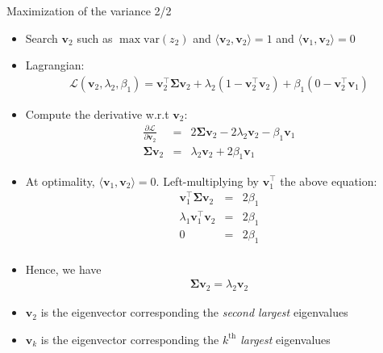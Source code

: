 \documentclass[10pt,aspectratio=1610]{beamer}
\begin{document}
\begin{frame}[label={sec:org77f1e4c}]{Maximization of the variance 2/2}
\begin{itemize}
\item <1-> Search \(\mathbf{v}_2\) such as \(\max\text{var}(z_2)\) and \(\langle\mathbf{v}_2,\mathbf{v}_2\rangle=1\) and \(\langle\mathbf{v}_1,\mathbf{v}_2\rangle=0\)
\item <2-> Lagrangian:
\begin{eqnarray*}
  \mathcal{L}(\mathbf{v}_2,\lambda_2,\beta_1) = \mathbf{v}_2^\top\boldsymbol{\Sigma}\mathbf{v}_2 + \lambda_2(1- \mathbf{v}_2^\top\mathbf{v}_2) + \beta_1(0 - \mathbf{v}_2^\top\mathbf{v}_1)
\end{eqnarray*}
\item <3-> Compute the derivative w.r.t \(\mathbf{v}_2\):
\begin{eqnarray*}
\frac{\partial\mathcal{L}}{\partial\mathbf{v}_2} &=& 2\boldsymbol{\Sigma}\mathbf{v}_2-2\lambda_2\mathbf{v}_2-\beta_1\mathbf{v}_1\\
\boldsymbol{\Sigma}\mathbf{v}_2 &=& \lambda_2\mathbf{v}_2+2\beta_1\mathbf{v}_1
\end{eqnarray*}
\item <4-> At optimality, \(\langle\mathbf{v}_1,\mathbf{v}_2\rangle=0\). Left-multiplying by \(\mathbf{v}_1^\top\) the above equation:
\begin{eqnarray*}
  \mathbf{v}_1^\top\boldsymbol{\Sigma}\mathbf{v}_2 &=& 2\beta_1 \\
  \lambda_1\mathbf{v}_1^\top\mathbf{v}_2 &=& 2\beta_1 \\
  0 &=& 2\beta_1 \\
\end{eqnarray*}
\item <5-> Hence, we have 
\begin{eqnarray*}
  \boldsymbol{\Sigma}\mathbf{v}_2 =\lambda_2\mathbf{v}_2
\end{eqnarray*}
\item <6-> \(\mathbf{v}_2\) is the eigenvector corresponding the \emph{second largest} eigenvalues
\item <7-> \(\mathbf{v}_k\) is the eigenvector corresponding the \emph{\(k^{\text{th}}\) largest} eigenvalues
\end{itemize}
\end{frame}
\end{document}
